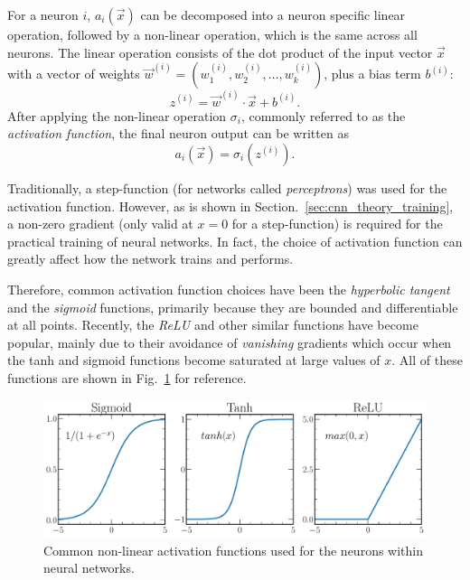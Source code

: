 For a neuron $i$, $a_{i}(\vec{x})$ can be decomposed into a neuron specific linear operation,
followed by a non-linear operation, which is the same across all neurons. The linear operation
consists of the dot product of the input vector $\vec{x}$ with a vector of weights
$\vec{w}^{(i)}=(w_{1}^{(i)}, w_{2}^{(i)},\dots,w_{k}^{(i)})$, plus a bias term $b^{(i)}$:
\begin{equation} %
    z^{(i)}=\vec{w}^{(i)}\cdot\vec{x}+b^{(i)}.
    \label{eq:network}
\end{equation}
After applying the non-linear operation $\sigma_{i}$, commonly referred to as the \emph{activation
    function}, the final neuron output can be written as
\begin{equation} %
    a_{i}(\vec{x})=\sigma_{i}(z^{(i)}).
    \label{eq:activation}
\end{equation}

Traditionally, a step-function (for networks called \emph{perceptrons}) was used for the
activation function. However, as is shown in Section.~\ref{sec:cnn_theory_training}, a non-zero
gradient (only valid at $x=0$ for a step-function) is required for the practical training of
neural networks. In fact, the choice of activation function can greatly affect how the network
trains and performs.

Therefore, common activation function choices have been the \emph{hyperbolic tangent} and the
\emph{sigmoid} functions, primarily because they are bounded and differentiable at all points.
Recently, the \emph{ReLU} and other similar functions have become popular, mainly due to their
avoidance of \emph{vanishing} gradients which occur when the tanh and sigmoid functions become
saturated at large values of $x$. All of these functions are shown in Fig.~\ref{fig:activations}
for reference.

\begin{figure} %
    \includegraphics[width=\textwidth]{diagrams/6-cnn/activations.pdf}
    \caption[Common non-linear activation functions]
    {Common non-linear activation functions used for the neurons within neural networks.}
    \label{fig:activations}
\end{figure}


